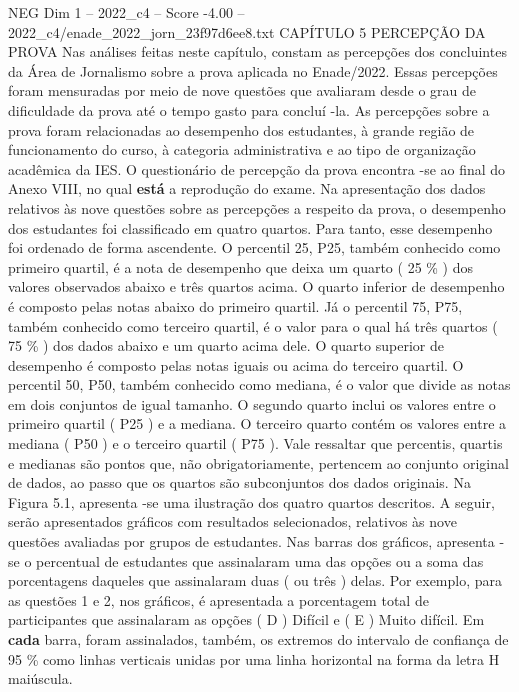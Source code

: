 \begin{textsample}{NEG Dim 1 – 2022\_c4 – Score -4.00 – 2022\_c4/enade\_2022\_jorn\_23f97d6ee8.txt}  \label{ex:f1_neg_176}
CAPÍTULO 5 PERCEPÇÃO DA PROVA Nas análises feitas neste capítulo, constam as percepções dos concluintes da Área de Jornalismo sobre a prova aplicada no Enade/2022.
Essas percepções foram mensuradas por meio de nove questões que avaliaram desde o grau de dificuldade da prova até o tempo gasto para concluí -la.
As percepções sobre a prova foram relacionadas ao desempenho dos estudantes, à grande região de funcionamento do curso, à categoria administrativa e ao tipo de organização acadêmica da IES.
O questionário de percepção da prova encontra -se ao final do Anexo VIII, no qual \textbf{está} a reprodução do exame.
Na apresentação dos dados relativos às nove questões sobre as percepções a respeito da prova, o desempenho dos estudantes foi classificado em quatro quartos.
Para tanto, esse desempenho foi ordenado de forma ascendente.
O percentil 25, P25, também conhecido como primeiro quartil, é a nota de desempenho que deixa um quarto ( 25 \% ) dos valores observados abaixo e três quartos acima.
O quarto inferior de desempenho é composto pelas notas abaixo do primeiro quartil.
Já o percentil 75, P75, também conhecido como terceiro quartil, é o valor para o qual há três quartos ( 75 \% ) dos dados abaixo e um quarto acima dele.
O quarto superior de desempenho é composto pelas notas iguais ou acima do terceiro quartil.
O percentil 50, P50, também conhecido como mediana, é o valor que divide as notas em dois conjuntos de igual tamanho.
O segundo quarto inclui os valores entre o primeiro quartil ( P25 ) e a mediana.
O terceiro quarto contém os valores entre a mediana ( P50 ) e o terceiro quartil ( P75 ).
Vale ressaltar que percentis, quartis e medianas são pontos que, não obrigatoriamente, pertencem ao conjunto original de dados, ao passo que os quartos são subconjuntos dos dados originais.
Na Figura 5.1, apresenta -se uma ilustração dos quatro quartos descritos.
A seguir, serão apresentados gráficos com resultados selecionados, relativos às nove questões avaliadas por grupos de estudantes.
Nas barras dos gráficos, apresenta -se o percentual de estudantes que assinalaram uma das opções ou a soma das porcentagens daqueles que assinalaram duas ( ou três ) delas.
Por exemplo, para as questões 1 e 2, nos gráficos, é apresentada a porcentagem total de participantes que assinalaram as opções ( D ) Difícil e ( E ) Muito difícil.
Em \textbf{cada} barra, foram assinalados, também, os extremos do intervalo de confiança de 95 \% como linhas verticais unidas por uma linha horizontal na forma da letra H maiúscula.

\end{textsample}
